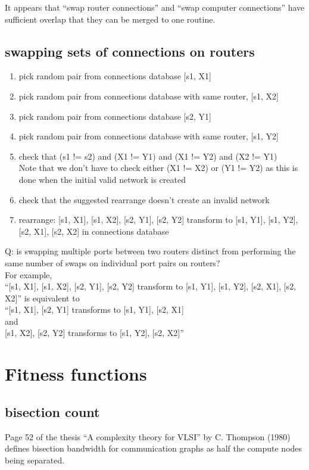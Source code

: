 \documentclass[pdftex]{article}
\begin{document}
It appears that ``swap router connections'' and ``swap computer connections'' have sufficient overlap that they can be merged to one routine.

\subsection{swapping sets of connections on routers}

\begin{enumerate}
 \item pick random pair from connections database {[}s1, X1]
 \item pick random pair from connections database with same router, {[}s1, X2]
 \item pick random pair from connections database {[}s2, Y1]
 \item pick random pair from connections database with same router, {[}s1, Y2]
 \item check that (s1 != s2) and  (X1 != Y1) and (X1 != Y2) and (X2 != Y1)\\
 Note that we don't have to check either (X1 != X2) or (Y1 != Y2) as this is done when the initial valid network is created
 \item check that the suggested rearrange doesn't create an invalid network 
 \item rearrange: {[}s1, X1], {[}s1, X2], {[}s2, Y1], {[}s2, Y2] transform to {[}s1, Y1], {[}s1, Y2], {[}s2, X1], {[}s2, X2] in connections database
\end{enumerate}

Q: is swapping multiple ports between two routers distinct from performing the same number of swaps on individual port pairs on routers?\\
For example,\\
``{[}s1, X1], {[}s1, X2], {[}s2, Y1], {[}s2, Y2] transform to {[}s1, Y1], {[}s1, Y2], {[}s2, X1], {[}s2, X2]'' is equivalent to\\
``{[}s1, X1], {[}s2, Y1] transforms to {[}s1, Y1], {[}s2, X1]\\
and\\
{[}s1, X2], {[}s2, Y2] transforms to {[}s1, Y2], {[}s2, X2]''

\section{Fitness functions}

\subsection{bisection count}
Page 52 of the thesis ``A complexity theory for VLSI'' by C. Thompson (1980) defines bisection bandwidth for communication graphs as half the compute nodes being separated.
\end{document}
